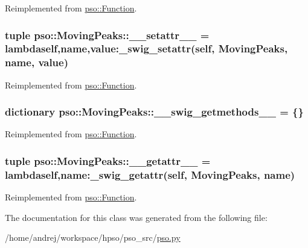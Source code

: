 Reimplemented from \hyperlink{classpso_1_1Function_2334bfe507115d58047f67960dde71d3}{pso::Function}.\hypertarget{classpso_1_1MovingPeaks_a30c9de8ca26c42218b1c3a211f7d0cf}{
\subsubsection{\setlength{\rightskip}{0pt plus 5cm}tuple {\bf pso::MovingPeaks::\_\-\_\-setattr\_\-\_\-} = lambdaself,name,value:\_\-swig\_\-setattr(self, {\bf MovingPeaks}, name, value)}}
\label{classpso_1_1MovingPeaks_a30c9de8ca26c42218b1c3a211f7d0cf}




Reimplemented from \hyperlink{classpso_1_1Function_cd8775cf6aadc3fdf4e6d82158ef10fb}{pso::Function}.\hypertarget{classpso_1_1MovingPeaks_5272ada93241271df664fb5ecdc73f0a}{
\subsubsection{\setlength{\rightskip}{0pt plus 5cm}dictionary {\bf pso::MovingPeaks::\_\-\_\-swig\_\-getmethods\_\-\_\-} = \{\}}}
\label{classpso_1_1MovingPeaks_5272ada93241271df664fb5ecdc73f0a}




Reimplemented from \hyperlink{classpso_1_1Function_5bddc07dbaab0ee579488bdcc8103a71}{pso::Function}.\hypertarget{classpso_1_1MovingPeaks_08590ac9c017e29081714cd95383a679}{
\subsubsection{\setlength{\rightskip}{0pt plus 5cm}tuple {\bf pso::MovingPeaks::\_\-\_\-getattr\_\-\_\-} = lambdaself,name:\_\-swig\_\-getattr(self, {\bf MovingPeaks}, name)}}
\label{classpso_1_1MovingPeaks_08590ac9c017e29081714cd95383a679}




Reimplemented from \hyperlink{classpso_1_1Function_affeed856b337656e88895fa35321496}{pso::Function}.

The documentation for this class was generated from the following file:\begin{CompactItemize}
\item 
/home/andrej/workspace/hpso/pso\_\-src/\hyperlink{pso_8py}{pso.py}\end{CompactItemize}
